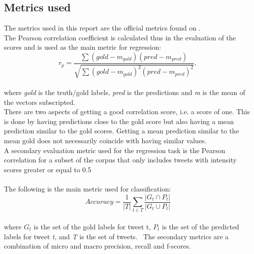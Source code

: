 \subsection{Metrics used} \label{sec:metrics}
The metrics used in this report are the official metrics found on \cite{codalab}. \\
The Pearson correlation coefficient is calculated thus in the evaluation of the scores and is used as the main metric for regression:\\
\begin{equation} \label{eq:pearson}
r_{p} = \dfrac{\sum \left(gold-m_{gold}\right) \left(pred-m_{pred}\right)}{\sqrt{\sum \left(gold-m_{gold}\right)^{2} \left(pred-m_{pred}\right)^{2}}},
\end{equation}\\
where \textit{gold} is the truth/gold labels, \textit{pred} is the predictions and \textit{m} is the mean of the vectors subscripted.\\
There are two aspects of getting a good correlation score, i.e. a score of one. This is done by having predictions close to the gold score but also having a mean prediction similar to the gold scores. Getting a mean prediction similar to the mean gold does not necessarily coincide with having similar values.\\
A secondary evaluation metric used for the regression task is the Pearson correlation for a subset of the corpus that only includes tweets with intensity scores greater or equal to 0.5 \\ \\
The following is the main metric used for classification:\\
\begin{equation} \label{eq:accuracy}
Accuracy = \dfrac{1}{\lvert T \rvert} \sum_{t\in T}\dfrac{\lvert G_{t} \cap P_{t}\rvert}{\lvert G_{t} \cup P_{t}\rvert}
\end{equation}\\
where $G_{t}$ is the set of the gold labels for tweet t, $P_{t}$ is the set of the predicted labels for tweet \textit{t}, and \textit{T} is the set of tweets. \
The secondary metrics are a combination of micro and macro precision, recall and f-scores.